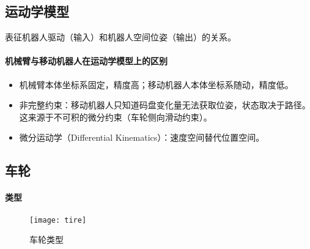 \documentclass[
12pt, %
a4paper, 
oneside, %
headinclude,footinclude, %
]{scrartcl}
\begin{document}
\subsection[运动学模型]{运动学模型}
表征机器人驱动（输入）和机器人空间位姿（输出）的关系。
\paragraph{机械臂与移动机器人在运动学模型上的区别}
\begin{itemize}
\item 机械臂本体坐标系固定，精度高；移动机器人本体坐标系随动，精度低。
\item 非完整约束：移动机器人只知道码盘变化量无法获取位姿，状态取决于路径。这来源于不可积的微分约束（车轮侧向滑动约束）。
\item 微分运动学（Differential Kinematics）：速度空间替代位置空间。
\end{itemize}
\subsection[车轮]{车轮}
\paragraph{类型}
\begin{figure}[H]
\centering 
\texttt{[image: tire]} 
\caption{车轮类型}
\end{figure}
\end{document}
